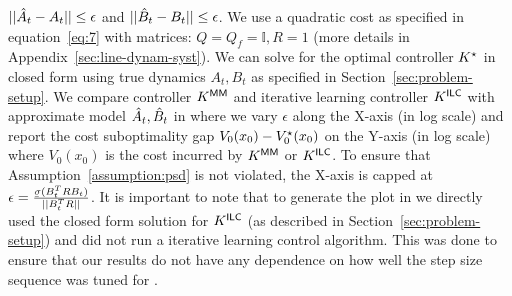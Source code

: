 $||\hat{A}_{t} - A_{t}|| \leq \epsilon$ and $||\hat{B}_{t} - B_{t}|| \leq \epsilon$.
We use a quadratic cost as specified in equation~\ref{eq:7} with matrices:
  $Q = Q_{f} = \mathbb{I}, R = 1$ (more details in Appendix~\ref{sec:line-dynam-syst}).
We can solve for the optimal controller $K^\star$ in closed form using true
dynamics $A_{t}, B_{t}$ as specified in Section~\ref{sec:problem-setup}. We compare
\MM{} controller $K^\mathsf{MM}$ 
and iterative learning controller $K^\mathsf{ILC}$ with approximate model
$\hat{A}_{t}, \hat{B}_{t}$ in  where we vary $\epsilon$ along
the X-axis (in log scale) and report the cost suboptimality gap
$V_{0}(x_{0}) - V^\star_{0}(x_{0})$ on the Y-axis
(in log scale) where $V_{0}(x_{0})$ is the cost incurred by $K^\mathsf{MM}$ or $K^\mathsf{ILC}$.
To ensure that
Assumption~\ref{assumption:psd} is not violated, the X-axis is capped at
$\epsilon = \frac{\ubar{\sigma}(B_{t}^{T}RB_{t})}{||B_{t}^{T}R||}$.
It is important to note that to generate the plot in  we
directly used the closed form solution for $K^\mathsf{ILC}$ (as described in
Section~\ref{sec:problem-setup}) and did not run a iterative learning control
algorithm. This was done to ensure that our results do not have any dependence
on how well the step size sequence was tuned for \ILC{}.

